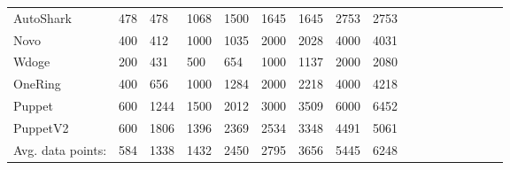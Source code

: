 \begin{table}[thbp]
\begin{tabular}{|l|llllllll|llllllll|}
        AutoShark         & 478  & 478   & 1068 & 1500  & 1645 & 1645   & 2753  & 2753   \\
        Novo              & 400  & 412   & 1000 & 1035  & 2000 & 2028   & 4000  & 4031   \\
        Wdoge             & 200  & 431   & 500  & 654   & 1000 & 1137   & 2000  & 2080   \\
        OneRing           & 400  & 656   & 1000 & 1284  & 2000 & 2218   & 4000  & 4218   \\
        Puppet            & 600  & 1244  & 1500 & 2012  & 3000 & 3509   & 6000  & 6452   \\
        PuppetV2          & 600  & 1806  & 1396 & 2369  & 2534 & 3348   & 4491  & 5061   \\ \hline
        Avg. data points: & 584  & 1338  & 1432 & 2450  & 2795 & 3656   & 5445  & 6248   \\ \hline
    \end{tabular}


\label{tab:SupDataPoint}
\end{table}